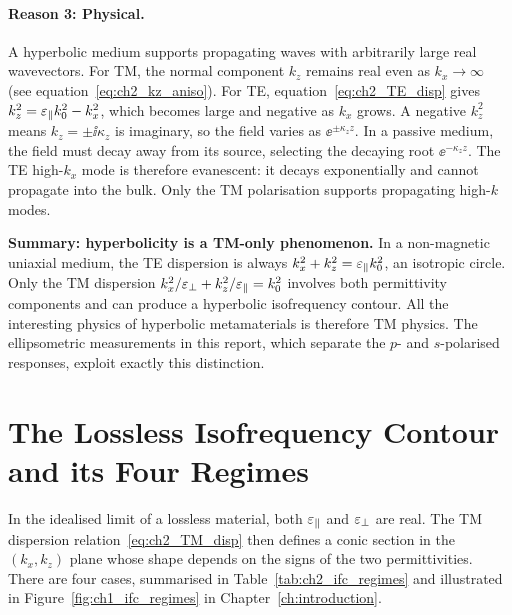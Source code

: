 \paragraph{Reason 3: Physical.} A hyperbolic medium supports propagating
waves with arbitrarily large real wavevectors. For TM, the normal component
$k_z$ remains real even as $k_x \to \infty$ (see equation~\eqref{eq:ch2_kz_aniso}).
For TE, equation~\eqref{eq:ch2_TE_disp} gives $k_z^2 = \varepsilon_{\parallel} k_0^2 - k_x^2$,
which becomes large and negative as $k_x$ grows. A negative $k_z^2$ means
$k_z = \pm\ii\kappa_z$ is imaginary, so the field varies as $\ee^{\pm\kappa_z z}$.
In a passive medium, the field must decay away from its source, selecting the
decaying root $\ee^{-\kappa_z z}$. The TE high-$k_x$ mode is therefore
evanescent: it decays exponentially and cannot propagate into the bulk.
Only the TM polarisation supports propagating high-$k$ modes.

\begin{resultbox}
\textbf{Summary: hyperbolicity is a TM-only phenomenon.} In a non-magnetic
uniaxial medium, the TE dispersion is always $k_x^2 + k_z^2 = \varepsilon_{\parallel} k_0^2$,
an isotropic circle. Only the TM dispersion
$k_x^2/\varepsilon_{\perp} + k_z^2/\varepsilon_{\parallel} = k_0^2$ involves both permittivity components
and can produce a hyperbolic isofrequency contour. All the interesting physics
of hyperbolic metamaterials is therefore TM physics. The ellipsometric
measurements in this report, which separate the $p$- and $s$-polarised
responses, exploit exactly this distinction.
\end{resultbox}

\section{The Lossless Isofrequency Contour and its Four Regimes}

In the idealised limit of a lossless material, both $\varepsilon_{\parallel}$ and $\varepsilon_{\perp}$ are
real. The TM dispersion relation~\eqref{eq:ch2_TM_disp} then defines a conic
section in the $(k_x, k_z)$ plane whose shape depends on the signs of the
two permittivities. There are four cases, summarised in
Table~\ref{tab:ch2_ifc_regimes} and illustrated in
Figure~\ref{fig:ch1_ifc_regimes} in Chapter~\ref{ch:introduction}.

